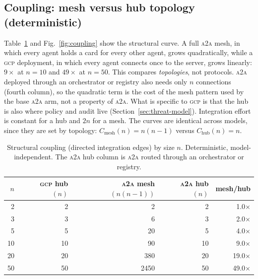 \documentclass[conference,letterpaper]{IEEEtran}
\newcommand{\gcp}{\textsc{gcp}}
\newcommand{\ata}{\textsc{a2a}}
\begin{document}
\subsection{Coupling: mesh versus hub topology (deterministic)}
Table~\ref{tab:struct} and Fig.~\ref{fig:coupling} show the structural curve. A full \ata{} mesh, in which every agent holds a card for every other agent, grows quadratically, while a \gcp{} deployment, in which every agent connects once to the server, grows linearly: $9\times$ at $n{=}10$ and $49\times$ at $n{=}50$. This compares \emph{topologies}, not protocols. \ata{} deployed through an orchestrator or registry also needs only $n$ connections (fourth column), so the quadratic term is the cost of the mesh pattern used by the base \ata{} arm, not a property of \ata{}. What is specific to \gcp{} is that the hub is also where policy and audit live (Section~\ref{sec:threat-model}). Integration effort is constant for a hub and $2n$ for a mesh. The curves are identical across models, since they are set by topology: $C_{\text{mesh}}(n)=n(n{-}1)$ versus $C_{\text{hub}}(n)=n$.

\begin{table}[H]
\centering
\caption{Structural coupling (directed integration edges) by size $n$. Deterministic, model-independent. The \ata{} hub column is \ata{} routed through an orchestrator or registry.}
\label{tab:struct}
\setlength{\tabcolsep}{4pt}
\begin{tabular}{rrrrr}
\toprule
$n$ & \gcp{} hub $(n)$ & \ata{} mesh $(n(n{-}1))$ & \ata{} hub $(n)$ & mesh/hub \\
\midrule
2  & 2  & 2    & 2  & 1.0$\times$ \\
3  & 3  & 6    & 3  & 2.0$\times$ \\
5  & 5  & 20   & 5  & 4.0$\times$ \\
10 & 10 & 90   & 10 & 9.0$\times$ \\
20 & 20 & 380  & 20 & 19.0$\times$ \\
50 & 50 & 2450 & 50 & 49.0$\times$ \\
\bottomrule
\end{tabular}
\end{table}
\end{document}
